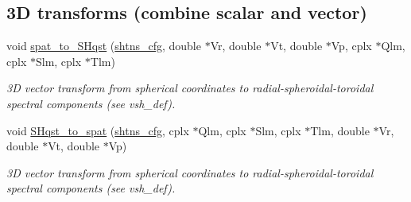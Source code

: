 \subsection*{3\+D transforms (combine scalar and vector)}
\begin{DoxyCompactItemize}
\item 
void \hyperlink{group__sht_ga7a2abea634001cf27dda2ea89acf72d6}{spat\+\_\+to\+\_\+\+S\+Hqst} (\hyperlink{shtns_8h_ab7bd78e5cbeb4ed18782d018195fde00}{shtns\+\_\+cfg}, double $\ast$Vr, double $\ast$Vt, double $\ast$Vp, cplx $\ast$Qlm, cplx $\ast$Slm, cplx $\ast$Tlm)
\begin{DoxyCompactList}\small\item\em 3\+D vector transform from spherical coordinates to radial-\/spheroidal-\/toroidal spectral components (see vsh\+\_\+def). \end{DoxyCompactList}\item 
void \hyperlink{group__sht_ga2ac092e557f8db54b530452dc8983a3b}{S\+Hqst\+\_\+to\+\_\+spat} (\hyperlink{shtns_8h_ab7bd78e5cbeb4ed18782d018195fde00}{shtns\+\_\+cfg}, cplx $\ast$Qlm, cplx $\ast$Slm, cplx $\ast$Tlm, double $\ast$Vr, double $\ast$Vt, double $\ast$Vp)
\begin{DoxyCompactList}\small\item\em 3\+D vector transform from spherical coordinates to radial-\/spheroidal-\/toroidal spectral components (see vsh\+\_\+def). \end{DoxyCompactList}\end{DoxyCompactItemize}
